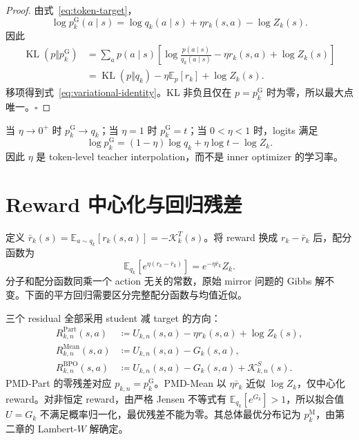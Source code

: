 \documentclass[lang=cn,scheme=chinese,openany]{../book/elegantbook}
\newcommand{\E}{\mathbb E}
\newcommand{\KL}{\operatorname{KL}}
\begin{document}
\begin{proof}
由式~\eqref{eq:token-target}，
\begin{equation*}
 \log  p_k^{\mathrm G}(a\mid s)=\log q_k(a\mid s)+\eta r_k(s,a)-\log Z_k(s).
\end{equation*}
因此
\begin{align*}
 \KL(p\Vert  p_k^{\mathrm G})
 &=\sum_a p(a\mid s)\left[
 \log\frac{p(a\mid s)}{ q_k(a\mid s)}
 -\eta r_k(s,a)+\log Z_k(s)\right]\\
 &=\KL(p\Vert q_k)-\eta\E_p[r_k]+\log Z_k(s).
\end{align*}
移项得到式~\eqref{eq:variational-identity}。KL 非负且仅在 $p= p_k^{\mathrm G}$ 时为零，所以最大点唯一。\hfill$\square$
\end{proof}

\begin{corollary}[几何插值与极限]
当 $\eta\to0^+$ 时 $ p_k^{\mathrm G}\to q_k$；当 $\eta=1$ 时 $ p_k^{\mathrm G}= t$；当 $0<\eta<1$ 时，logits 满足
\begin{equation*}
 \log  p_k^{\mathrm G}=(1-\eta)\log q_k+\eta\log t-\log Z_k.
\end{equation*}
因此 $\eta$ 是 token-level teacher interpolation，而不是 inner optimizer 的学习率。
\end{corollary}

\section{Reward 中心化与回归残差}

定义 $\bar r_k(s)=\mathbb E_{a\sim q_k}[r_k(s,a)]=-\mathcal K_k^T(s)$。将 reward 换成 $r_k-\bar r_k$ 后，配分函数为
\begin{equation*}
\mathbb E_{ q_k}[e^{\eta(r_k-\bar r_k)}]=e^{-\eta\bar r_k}Z_k.
\end{equation*}
分子和配分函数同乘一个 action 无关的常数，原始 mirror 问题的 Gibbs 解不变。下面的平方回归需要区分完整配分函数与均值近似。

三个 residual 全部采用 student 减 target 的方向：
\begin{align}
R^{\mathrm{Part}}_{k,n}(s,a)&\coloneqq U_{k,n}(s,a)-\eta r_k(s,a)+\log Z_k(s),\label{eq:part-residual}\\
R^{\mathrm{Mean}}_{k,n}(s,a)&\coloneqq U_{k,n}(s,a)-G_k(s,a),\label{eq:mean-residual}\\
R^{\mathrm{BPO}}_{k,n}(s,a)&\coloneqq U_{k,n}(s,a)-G_k(s,a)+\mathcal K_{k,n}^S(s).
\end{align}
PMD-Part 的零残差对应 $ p_{k,n}= p_k^{\mathrm G}$。PMD-Mean 以 $\eta\bar r_k$ 近似 $\log Z_k$，仅中心化 reward。对非恒定 reward，由严格 Jensen 不等式有 $\mathbb E_{ q_k}[e^{G_k}]>1$，所以拟合值 $U=G_k$ 不满足概率归一化，最优残差不能为零。其总体最优分布记为 $ p_k^{\mathrm M}$，由第二章的 Lambert-$W$ 解确定。
\end{document}
